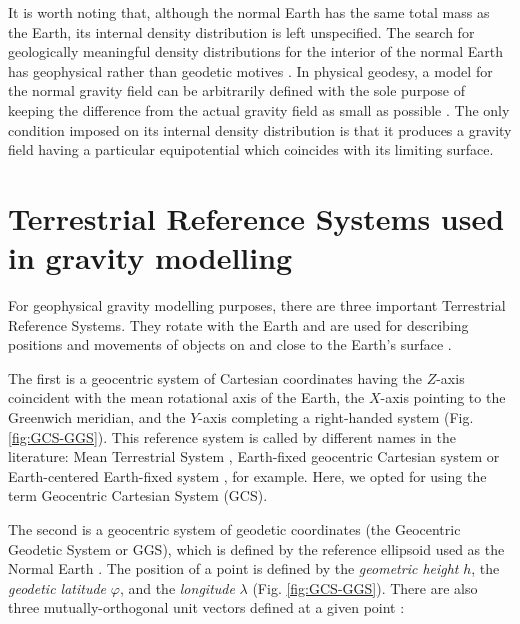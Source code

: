 \documentclass[extra]{gji}
\begin{document}
It is worth noting that, although the normal Earth has the same total mass as
the Earth, its internal density distribution is left unspecified.
The search for geologically meaningful density distributions
for the interior of the normal Earth has
geophysical rather than geodetic motives \citep{marussi1974}.
In physical geodesy, a model for the normal gravity field
can be arbitrarily defined with the sole purpose of
keeping the difference from the actual gravity field
as small as possible \citep{vanicek1987}.
The only condition imposed on its internal density
distribution is that it produces a gravity field
having a particular equipotential which coincides
with its limiting surface.


\section{Terrestrial Reference Systems used in gravity modelling}

For geophysical gravity modelling purposes, there are three important
Terrestrial Reference Systems.
They rotate with the Earth and are used for describing
positions and movements of objects on and close to the Earth's surface
\citep{torge2012}.

The first is a geocentric system of Cartesian coordinates
having the $Z$-axis coincident with the mean rotational axis of the Earth,
the $X$-axis pointing to the Greenwich meridian,
and the $Y$-axis completing a right-handed system (Fig. \ref{fig:GCS-GGS}).
This reference system is called by different names in the literature:
Mean Terrestrial System \citep[e.g.,][]{soler1976},
Earth-fixed geocentric Cartesian system \citep[e.g.,][]{torge2012}
or Earth-centered Earth-fixed system \citep[e.g.,][]{bouman_etal2013},
for example.
Here, we opted for using the term Geocentric Cartesian System (GCS).

The second is a geocentric system of geodetic coordinates
(the Geocentric Geodetic System or GGS),
which is defined by the reference ellipsoid used as the Normal Earth
\citep{heiskanen-moritz1967, soler1976, torge2012, bouman_etal2013}.
The position of a point is defined by
the \textit{geometric height} $h$,
the \textit{geodetic latitude} $\varphi$,
and the \textit{longitude} $\lambda$ (Fig. \ref{fig:GCS-GGS}).
There are also three mutually-orthogonal unit vectors defined at a given point
\citep{soler1976}:
\end{document}
